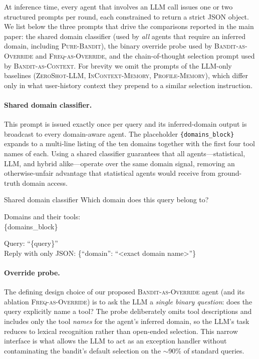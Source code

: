 At inference time, every agent that involves an LLM call issues one or
two structured prompts per round, each constrained to return a strict
JSON object. We list below the three prompts that drive the comparisons
reported in the main paper: the shared domain classifier (used by
\emph{all} agents that require an inferred domain, including
\textsc{Pure-Bandit}), the binary override probe used by
\textsc{Bandit-as-Override} and \textsc{Freq-as-Override}, and the
chain-of-thought selection prompt used by \textsc{Bandit-as-Context}.
For brevity we omit the prompts of the LLM-only baselines
(\textsc{ZeroShot-LLM}, \textsc{InContext-Memory},
\textsc{Profile-Memory}), which differ only in what user-history
context they prepend to a similar selection instruction.

\paragraph{Shared domain classifier.}
This prompt is issued exactly once per query and its inferred-domain
output is broadcast to every domain-aware agent. The placeholder
\texttt{\{domains\_block\}} expands to a multi-line listing of the ten
domains together with the first four tool names of each. Using a
shared classifier guarantees that all agents---statistical, LLM, and
hybrid alike---operate over the same domain signal, removing an
otherwise-unfair advantage that statistical agents would receive from
ground-truth domain access.

\begin{promptbox}{Shared domain classifier}
Which domain does this query belong to?

Domains and their tools:\\
\{domains\_block\}

Query: ``\{query\}''\\
Reply with only JSON: \{``domain'': ``<exact domain name>''\}
\end{promptbox}

\paragraph{Override probe.}
The defining design choice of our proposed \textsc{Bandit-as-Override}
agent (and its ablation \textsc{Freq-as-Override}) is to ask the LLM a
\emph{single binary question}: does the query explicitly name a tool?
The probe deliberately omits tool descriptions and includes only the
tool \emph{names} for the agent's inferred domain, so the LLM's task
reduces to lexical recognition rather than open-ended selection.
This narrow interface is what allows the LLM to act as an exception
handler without contaminating the bandit's default selection on the
$\sim$90\% of standard queries.

